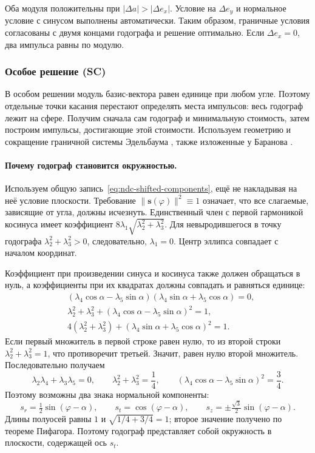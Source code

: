 Оба модуля положительны при $|\Delta a|>|\Delta e_x|$.
Условие на $\Delta e_y$ и нормальное условие с синусом выполнены
автоматически. Таким образом, граничные условия согласованы
с двумя концами годографа и решение оптимально.
Если $\Delta e_x=0$, два импульса равны по модулю.


\subsubsection{Особое решение (SC)}
\label{sec:singular}

В особом решении модуль базис-вектора равен единице при любом
угле. Поэтому отдельные точки касания перестают определять
места импульсов: весь годограф лежит на сфере.
Получим сначала сам годограф и минимальную стоимость, затем
построим импульсы, достигающие этой стоимости.
Используем геометрию и сокращение граничной системы Эдельбаума
\cite[с.~44--45, 54--56]{edelbaum}, также изложенные у Баранова
\cite[гл.~2]{baranov-ru}.

\paragraph{Почему годограф становится окружностью.}
Используем общую запись~\eqref{eq:ndc-shifted-components},
ещё не накладывая на неё условие плоскости.
Требование $\|\boldsymbol s(\varphi)\|^2\equiv1$ означает, что
все слагаемые, зависящие от угла, должны исчезнуть.
Единственный член с первой гармоникой косинуса имеет коэффициент
$8\lambda_1\sqrt{\lambda_2^2+\lambda_3^2}$.
Для невыродившегося в точку годографа
$\lambda_2^2+\lambda_3^2>0$, следовательно, $\lambda_1=0$.
Центр эллипса совпадает с началом координат.

Коэффициент при произведении синуса и косинуса также должен
обращаться в нуль, а коэффициенты при их квадратах должны
совпадать и равняться единице:
\begin{equation}
\begin{aligned}
 &(\lambda_4\cos\alpha-\lambda_5\sin\alpha)
  (\lambda_4\sin\alpha+\lambda_5\cos\alpha)=0,\\
 &\lambda_2^2+\lambda_3^2+
       (\lambda_4\cos\alpha-\lambda_5\sin\alpha)^2=1,\\
 &4(\lambda_2^2+\lambda_3^2)+
       (\lambda_4\sin\alpha+\lambda_5\cos\alpha)^2=1.
\end{aligned}
\label{eq:sc-constant-norm}
\end{equation}
Если первый множитель в первой строке равен нулю, то из второй
строки $\lambda_2^2+\lambda_3^2=1$, что противоречит третьей.
Значит, равен нулю второй множитель. Последовательно получаем
\[
 \lambda_2\lambda_4+\lambda_3\lambda_5=0,\qquad
 \lambda_2^2+\lambda_3^2=\frac14,\qquad
 (\lambda_4\cos\alpha-\lambda_5\sin\alpha)^2=\frac34.
\]
Поэтому возможны два знака нормальной компоненты:
\[
 s_r=\tfrac12\sin(\varphi-\alpha),\qquad
 s_t=\cos(\varphi-\alpha),\qquad
 s_z=\pm\tfrac{\sqrt3}{2}\sin(\varphi-\alpha).
\]
Длины полуосей равны $1$ и $\sqrt{1/4+3/4}=1$; второе значение
получено по теореме Пифагора. Поэтому годограф представляет собой
окружность в плоскости, содержащей ось $s_t$.

